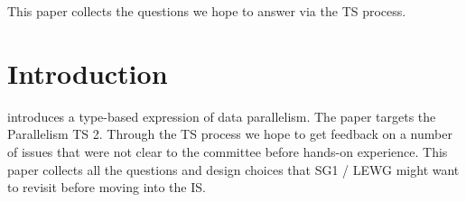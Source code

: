 \newcommand\wgTitle{Expected Feedback from \code{simd} in the Parallelism TS 2}
\newcommand\wgName{Matthias Kretz <m.kretz@gsi.de>}
\newcommand\wgDocumentNumber{DXXXXR0}
\newcommand\wgGroup{SG1 / LEWG}

\usepackage{mymacros}
\usepackage{wg21}
\usepackage{underscore}



\newcommand\simd[1][]{\type{simd#1}\xspace}
\newcommand\simdT{\type{simd<T>}\xspace}
\newcommand\valuetype{\type{value\_type}\xspace}
\newcommand\referencetype{\type{reference}\xspace}
\newcommand\whereexpression{\type{where\_expression}\xspace}
\newcommand\simdcast{\code{simd\_cast}\xspace}
\newcommand\mask[1][]{\type{simd\_mask#1}\xspace}
\newcommand\maskT{\type{simd\_mask<T>}\xspace}
\newcommand\fixedsizeN{\type{simd\_abi::fixed\_size<N>}\xspace}
\newcommand\fixedsizescoped{\type{simd\_abi::fixed\_size}\xspace}
\newcommand\fixedsize{\type{fixed\_size}\xspace}
\newcommand\simdEP{\code{execution::}\type{simd}\xspace}
\newcommand\seqEP{\code{execution::}\type{seq}\xspace}

\usepackage{pifont}

\newcommand\foralli[1][]{for all \code i $\in$ \code{[0, #1size())}\xspace}
\newcommand\forallmaskedi[1]{%
  for all \code i
  $\in \{j \in \mathbb{N}_0 | j < \code{size()} ⋀ \code{#1[}j\code{]}\}$%
  \xspace%
}
\newcommand\chck{\item[\color{black}\ensuremath{\checkmark}]}
\newcommand\todo{\item[\color{black}\ding{46}] \color{gray}}
\newcommand\itemheader[1]{\item[] \hfill \textcolor{gray}{\textsc{#1}}}


\begin{wgTitlepage}
  This paper collects the questions we hope to answer via the TS process.
\end{wgTitlepage}

\pagestyle{scrheadings}
\section{Introduction}
\textcite{P0214R6} introduces a type-based expression of data parallelism.
The paper targets the Parallelism TS 2.
Through the TS process we hope to get feedback on a number of issues that were not clear to the committee before hands-on experience.
This paper collects all the questions and design choices that SG1 / LEWG might want to revisit before moving \simdT into the IS.

